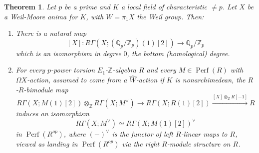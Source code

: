 \documentclass[10pt,a4paper]{amsart}
\newtheorem{theorem}{Theorem}
\newcommand{\mbb}{\mathbb}
\newcommand{\on}{\operatorname}
\newcommand{\wh}{\widehat}
\begin{document}
\begin{theorem}\label{localtate}
Let $p$ be a prime and $K$ a local field of characteristic $\neq p$.  Let $X$ be a Weil-Moore anima for $K$, with $W=\pi_1X$ the Weil group.  Then:
\begin{enumerate}
\item There is a natural map
$$[X]:R\Gamma(X;\left(\mbb{Q}_p/\mbb{Z}_p\right)(1)[2])\to \mbb{Q}_p/\mbb{Z}_p$$
which is an isomorphism in degree $0$, the bottom (homological) degree.
\item For every $p$-power torsion $E_1$-$\mbb{Z}$-algebra $R$ and every $M\in\on{Perf}(R)$ with $\Omega X$-action, assumed to come from a $\wh{W}$-action if $K$ is nonarchimedean, the $R$-$R$-bimodule map
$$R\Gamma(X;M(1)[2])\otimes_\mbb{Z} R\Gamma(X;M^\vee)\to R\Gamma(X;R(1)[2])\overset{[X]\otimes_{\mbb{Z}}R[-1]}{\longrightarrow} R$$
induces an isomorphism
$$R\Gamma(X;M^\vee)\simeq R\Gamma(X;M(1)[2])^\vee$$
in $\on{Perf}(R^{op})$, where $(-)^\vee$ is the functor of left $R$-linear maps to $R$, viewed as landing in $\on{Perf}(R^{op})$ via the right $R$-module structure on $R$.

\end{enumerate}
\end{theorem}
\end{document}
